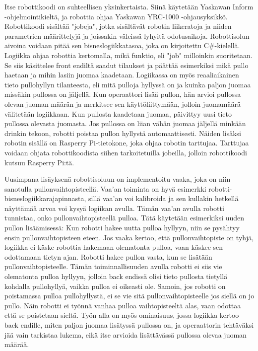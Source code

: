 Itse robottikoodi on suhteellisen yksinkertaista. Siinä käytetään Yaskawan Inform \hyp{}ohjelmointikieltä, ja robottia ohjaa Yaskawan YRC-1000 -ohjausyksikkö. Robottikoodi sisältää "jobeja", jotka sisältävät robotin liikeratoja ja niiden parametrien määrittelyjä ja joissakin väleissä lyhyitä odotusaikoja. Robottisolun aivoina voidaan pitää sen bisneslogiikkatasoa, joka on kirjoitettu C\#-kielellä. Logiikka ohjaa robottia kertomalla, mikä funktio, eli "job" milloinkin suoritetaan. Se siis käsittelee front endiltä saadut tilaukset ja päättää esimerkiksi mikä pullo haetaan ja mihin lasiin juomaa kaadetaan. Logiikassa on myös reaaliaikainen tieto pullohyllyn tilanteesta, eli mitä pulloja hyllyssä on ja kuinka paljon juomaa missäkin pullossa on jäljellä. Kun operaattori lisää pullon, hän arvioi pullossa olevan juoman määrän ja merkitsee sen käyttöliittymään, jolloin juomamäärä välitetään logiikkaan. Kun pullosta kaadetaan juomaa, päivittyy uusi tieto pullossa olevasta juomasta. Jos pullossa on liian vähän juomaa jäljellä minkään drinkin tekoon, robotti poistaa pullon hyllystä automaattisesti. Näiden lisäksi robotin sisällä on Rasperry Pi-tietokone, joka ohjaa robotin tarttujaa. Tarttujaa voidaan ohjata robottikoodista siihen tarkoitetuilla jobeilla, jolloin robottikoodi kutsuu Rasperry Pi:tä.

Uusimpana lisäyksenä robottisoluun on implementoitu vaaka, joka on niin sanotulla pullonvaihtopisteellä. Vaa'an toiminta on hyvä esimerkki robotti-bisneslogiikkarajapinnasta, sillä vaa'an voi kalibroida ja sen kullakin hetkellä näyttämää arvoa voi kysyä logiikan avulla. Tämän vaa'an avulla robotti tunnistaa, onko pullonvaihtopisteellä pulloa. Tätä käytetään esimerkiksi uuden pullon lisäämisessä: Kun robotti hakee uutta pulloa hyllyyn, niin se pysähtyy ensin pullonvaihtopisteen eteen. Jos vaaka kertoo, että pullonvaihtopiste on tyhjä, logiikka ei käske robottia hakemaan olematonta pulloa, vaan käskee sen odottamaan tietyn ajan. Robotti hakee pullon vasta, kun se lisätään pullonvaihtopisteelle. Tämän toiminnallisuuden avulla robotti ei siis vie olematonta pulloa hyllyyn, jolloin back endissä olisi tieto pullosta tietyllä kohdalla pullohyllyä, vaikka pulloa ei oikeasti ole. Samoin, jos robotti on poistamassa pulloa pullohyllystä, ei se vie sitä pullonvaihtopisteelle jos siellä on jo pullo. Näin robotti ei työnnä vanhaa pulloa vaihtopisteeltä alas, vaan odottaa että se poistetaan sieltä. Työn alla on myös ominaisuus, jossa logiikka kertoo back endille, miten paljon juomaa lisätyssä pullossa on, ja operaattorin tehtäväksi jää vain tarkistaa lukema, eikä itse arvioida lisättävässä pullossa olevaa juoman määrää.
